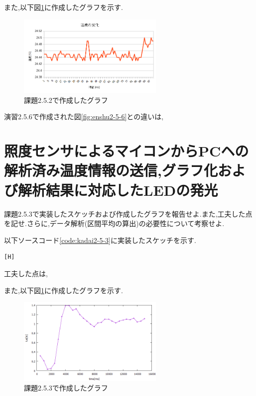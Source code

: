 \documentclass{jarticle}
\begin{document}
また,以下図\ref{fig:kadai2-5-2}に作成したグラフを示す.

\begin{figure}[H]
\begin{center}
\includegraphics[width=7.0cm]{images/kadai2-5-2.png}
\caption{課題2.5.2で作成したグラフ}
\label{fig:kadai2-5-2}
\end{center}
\end{figure}

演習2.5.6で作成された図\ref{fig:enshu2-5-6}との違いは,

\section{照度センサによるマイコンからPCヘの解析済み温度情報の送信,グラフ化および解析結果に対応したLEDの発光}
課題2.5.3で実装したスケッチおよび作成したグラフを報告せよ.また,工夫した点を記せ.さらに,データ解析(区間平均の算出)の必要性について考察せよ.

以下ソースコード\ref{code:kadai2-5-3}に実装したスケッチを示す.
\begin{lstlisting}[caption = 課題2.5.3,label=code:kadai2-5-3][H]

\end{lstlisting}
工夫した点は,

また,以下図\ref{fig:kadai2-5-2}に作成したグラフを示す.

\begin{figure}[H]
\begin{center}
\includegraphics[width=7.0cm]{images/kadai2-5-3.png}
\caption{課題2.5.3で作成したグラフ}
\label{fig:kadai2-5-3}
\end{center}
\end{figure}
\end{document}
